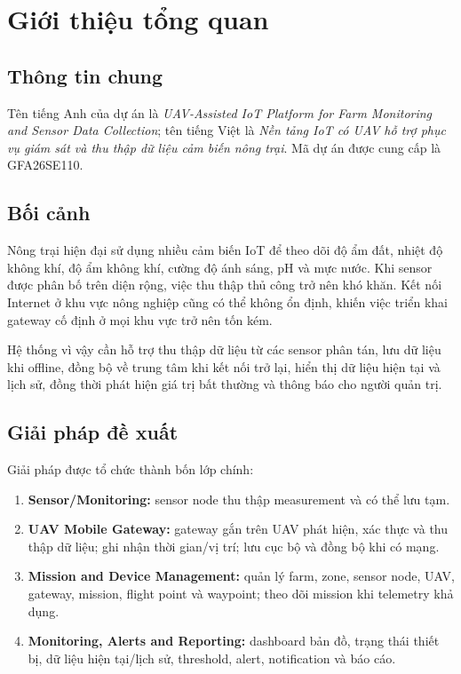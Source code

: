 \chapter{Giới thiệu tổng quan}

\section{Thông tin chung}
Tên tiếng Anh của dự án là \textit{UAV-Assisted IoT Platform for Farm Monitoring and Sensor Data Collection}; tên tiếng Việt là \textit{Nền tảng IoT có UAV hỗ trợ phục vụ giám sát và thu thập dữ liệu cảm biến nông trại}. Mã dự án được cung cấp là GFA26SE110.

\section{Bối cảnh}
Nông trại hiện đại sử dụng nhiều cảm biến IoT để theo dõi độ ẩm đất, nhiệt độ không khí, độ ẩm không khí, cường độ ánh sáng, pH và mực nước. Khi sensor được phân bố trên diện rộng, việc thu thập thủ công trở nên khó khăn. Kết nối Internet ở khu vực nông nghiệp cũng có thể không ổn định, khiến việc triển khai gateway cố định ở mọi khu vực trở nên tốn kém.

Hệ thống vì vậy cần hỗ trợ thu thập dữ liệu từ các sensor phân tán, lưu dữ liệu khi offline, đồng bộ về trung tâm khi kết nối trở lại, hiển thị dữ liệu hiện tại và lịch sử, đồng thời phát hiện giá trị bất thường và thông báo cho người quản trị.

\section{Giải pháp đề xuất}
Giải pháp được tổ chức thành bốn lớp chính:
\begin{enumerate}
  \item \textbf{Sensor/Monitoring:} sensor node thu thập measurement và có thể lưu tạm.
  \item \textbf{UAV Mobile Gateway:} gateway gắn trên UAV phát hiện, xác thực và thu thập dữ liệu; ghi nhận thời gian/vị trí; lưu cục bộ và đồng bộ khi có mạng.
  \item \textbf{Mission and Device Management:} quản lý farm, zone, sensor node, UAV, gateway, mission, flight point và waypoint; theo dõi mission khi telemetry khả dụng.
  \item \textbf{Monitoring, Alerts and Reporting:} dashboard bản đồ, trạng thái thiết bị, dữ liệu hiện tại/lịch sử, threshold, alert, notification và báo cáo.
\end{enumerate}
